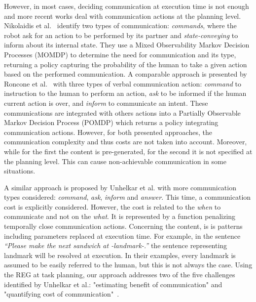 However, in most cases, deciding communication at execution time is not enough and more recent works deal with communication actions at the planning level. Nikolaidis et al.~\cite{nikolaidis_2018_planning} identify two types of communication: \textit{commands}, where the robot ask for an action to be performed by its partner and \textit{state-conveying} to inform about its internal state. They use a Mixed Observability Markov Decision Processes (MOMDP) to determine the need for communication and its type, returning a policy capturing the probability of the human to take a given action based on the performed communication. A comparable approach is presented by Roncone et al.~\cite{roncone_2017_transparent} with three types of verbal communication action: \textit{command} to instruction to the human to perform an action, \textit{ask} to be informed if the human current action is over, and \textit{inform} to communicate an intent. These communications are integrated with others actions into a Partially Observable Markov Decision Process (POMDP) which returns a policy integrating communication actions. However, for both presented approaches, the communication complexity and thus costs are not taken into account. Moreover, while for the first the content is pre-generated, for the second it is not specified at the planning level. This can cause non-achievable communication in some situations.

A similar approach is proposed by Unhelkar et al. \cite{unhelkar_2020_decision} with more communication types considered: \textit{command}, \textit{ask}, \textit{inform} and \textit{answer}. This time, a communication cost is explicitly considered. However, the cost is related to the \textit{when} to communicate and not on the \textit{what}. It is represented by a function penalizing temporally close communication actions. Concerning the content, is is patterns including parameters replaced at execution time. For example, in the sentence \textit{“Please make the next sandwich at -landmark-.”} the sentence representing landmark will be resolved at execution. In their examples, every landmark is assumed to be easily referred to the human, but this is not always the case. Using the REG at task planning, our approach addresses two of the five challenges identified by Unhelkar et al.: "estimating benefit of communication" and "quantifying cost of communication"~\cite{unhelkar_2017_challenges}.

